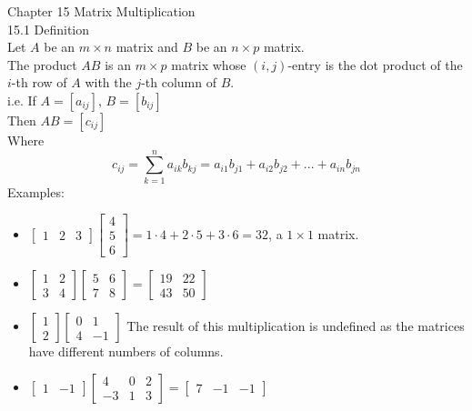 \documentclass[]{article}
\begin{document}
		\pagebreak
		\Large{Chapter 15 Matrix Multiplication}\\
		\large{15.1 Definition}\\
		\normalsize
		Let $A$ be an $m\times n$ matrix and $B$ be an $n\times p$ matrix.\\
		The product $AB$ is an $m\times p$ matrix whose $(i,j)$-entry is the dot product of the $i$-th row of $A$ with the $j$-th column of $B$.\\
		i.e. If $A=[a_{ij}]$, $B=[b_{ij}]$\\
		Then $AB=[c_{ij}]$\\
		Where
		\large$$
			c_{ij}=\sum^{n}_{k=1}a_{ik}b_{kj}=a_{i1}b_{j1}+a_{i2}b_{j2}+...+a_{in}b_{jn}
		$$
		\normalsize
		Examples:
		\begin{itemize}
			\item $\begin{bmatrix}{1}&{2}&{3}\end{bmatrix}\begin{bmatrix}{4}\\{5}\\{6}\end{bmatrix}=1\cdot 4+2\cdot 5+3\cdot 6=32$, a $1\times 1$ matrix.
			\item $\begin{bmatrix}{1}&{2}\\{3}&{4}\end{bmatrix}\begin{bmatrix}{5}&{6}\\{7}&{8}\end{bmatrix}=\begin{bmatrix}{19}&{22}\\{43}&{50}\end{bmatrix}$
			\item $\begin{bmatrix}{1}\\{2}\end{bmatrix}\begin{bmatrix}{0}&{1}\\{4}&{-1}\end{bmatrix}$ The result of this multiplication is undefined as the matrices have different numbers of columns.
			\item $\begin{bmatrix}{1}&{-1}\end{bmatrix}\begin{bmatrix}{4}&{0}&{2}\\{-3}&{1}&{3}\end{bmatrix}=\begin{bmatrix}{7}&{-1}&{-1}\end{bmatrix}$

\end{itemize}
\end{document}
